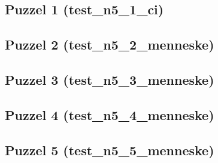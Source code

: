 \documentclass[]{report}
\begin{document}
\begin{appendices}
\subsection{Puzzel 1 (test\_n5\_1\_ci)}

\subsection{Puzzel 2 (test\_n5\_2\_menneske)}
\subsection{Puzzel 3 (test\_n5\_3\_menneske)}
\subsection{Puzzel 4 (test\_n5\_4\_menneske)}
\subsection{Puzzel 5 (test\_n5\_5\_menneske)}

\end{appendices}
\end{document}
